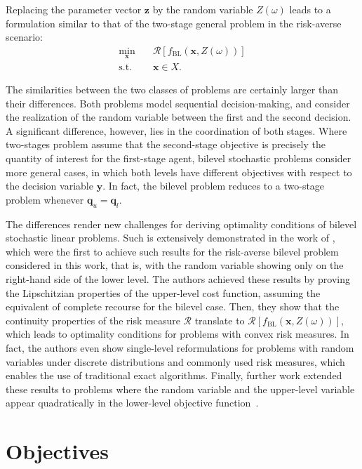 \documentclass[12pt]{article}
\begin{document}
Replacing the parameter vector $\bm{z}$ by the random variable $Z(\omega)$ leads to a formulation similar to that of the two-stage general problem in the risk-averse scenario:
\begin{align*}
    \min_{\bm{x}} \quad & \mathcal{R}\left[ f_\text{BL}(\bm{x},Z(\omega)) \right]  \\
    \textrm{s.t.} \quad & \bm{x} \in X
.\end{align*}

The similarities between the two classes of problems are certainly larger than their differences.
Both problems model sequential decision-making, and consider the realization of the random variable between the first and the second decision.
A significant difference, however, lies in the coordination of both stages.
Where two-stages problem assume that the second-stage objective is precisely the quantity of interest for the first-stage agent, bilevel stochastic problems consider more general cases, in which both levels have different objectives with respect to the decision variable $\bm{y}$.
In fact, the bilevel problem reduces to a two-stage problem whenever $\bm{q}_u = \bm{q}_l$.

The differences render new challenges for deriving optimality conditions of bilevel stochastic linear problems.
Such is extensively demonstrated in the work of \citet{burtscheidtRiskAverseModelsBilevel2020}, which were the first to achieve such results for the risk-averse bilevel problem considered in this work, that is, with the random variable showing only on the right-hand side of the lower level.
The authors achieved these results by proving the Lipschitzian properties of the upper-level cost function, assuming the equivalent of complete recourse for the bilevel case.
Then, they show that the continuity properties of the risk measure $\mathcal{R}$ translate to $\mathcal{R}\left[ f_\text{BL}(\bm{x},Z(\omega)) \right] $, which leads to optimality conditions for problems with convex risk measures.
In fact, the authors even show single-level reformulations for problems with random variables under discrete distributions and commonly used risk measures, which enables the use of traditional exact algorithms.
Finally, further work extended these results to problems where the random variable and the upper-level variable appear quadratically in the lower-level objective function~\cite{clausContinuityRiskaverseBilevel2021,clausExistenceSolutionsClass2022a}.


\section*{Objectives}
\end{document}
